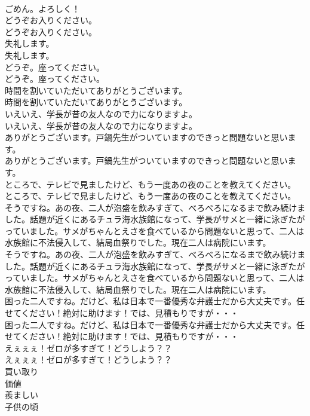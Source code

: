\documentclass[8pt]{extreport}
\begin{document}
\begin{CJK}{UTF8}{min}
\\	ごめん。よろしく！ 
\\	どうぞお入りください。	
\\	どうぞお入りください。 
\\	失礼します。	
\\	失礼します。 
\\	どうぞ。座ってください。	
\\	どうぞ。座ってください。 
\\	時間を割いていただいてありがとうございます。	
\\	時間を割いていただいてありがとうございます。 
\\	いえいえ、学長が昔の友人なので力になりますよ。	
\\	いえいえ、学長が昔の友人なので力になりますよ。 
\\	ありがとうございます。戸鍋先生がついていますのできっと問題ないと思います。	
\\	ありがとうございます。戸鍋先生がついていますのできっと問題ないと思います。 
\\	ところで、テレビで見ましたけど、もう一度あの夜のことを教えてください。	
\\	ところで、テレビで見ましたけど、もう一度あの夜のことを教えてください。 
\\	そうですね。あの夜、二人が泡盛を飲みすぎて、べろべろになるまで飲み続けました。話題が近くにあるチュラ海水族館になって、学長がサメと一緒に泳ぎたがっていました。サメがちゃんとえさを食べているから問題ないと思って、二人は水族館に不法侵入して、結局血祭りでした。現在二人は病院にいます。	
\\	そうですね。あの夜、二人が泡盛を飲みすぎて、べろべろになるまで飲み続けました。話題が近くにあるチュラ海水族館になって、学長がサメと一緒に泳ぎたがっていました。サメがちゃんとえさを食べているから問題ないと思って、二人は水族館に不法侵入して、結局血祭りでした。現在二人は病院にいます。 
\\	困った二人ですね。だけど、私は日本で一番優秀な弁護士だから大丈夫です。任せてください！絶対に助けます！では、見積もりですが・・・	
\\	困った二人ですね。だけど、私は日本で一番優秀な弁護士だから大丈夫です。任せてください！絶対に助けます！では、見積もりですが・・・ 
\\	えぇぇぇ！ゼロが多すぎて！どうしよう？？	
\\	えぇぇぇ！ゼロが多すぎて！どうしよう？？ 
\\	買い取り
\\	価値
\\	羨ましい
\\	子供の頃

\end{CJK}
\end{document}
